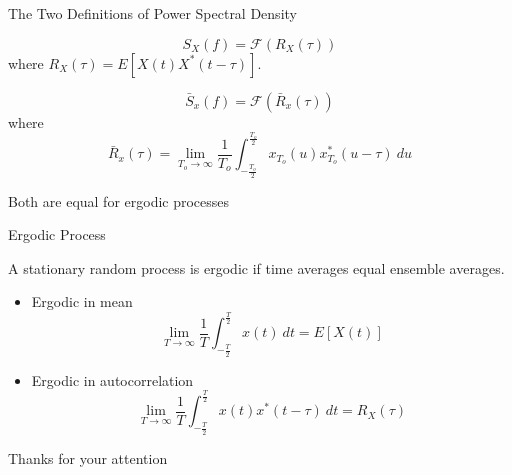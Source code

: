 \documentclass[t]{beamer}
\begin{document}
\begin{frame}{The Two Definitions of Power Spectral Density}
  \footnotesize
  \begin{definition}
    \pause
    \begin{equation*}
      S_X(f) = \mathcal{F}\left(R_X(\tau)\right)
    \end{equation*}
    where $R_X(\tau) = E\left[ X(t)X^*(t-\tau)\right]$.
  \end{definition}
  \pause
  \begin{definition}
    \begin{equation*}
    \bar{S}_x(f) = \mathcal{F}\left(\bar{R}_x(\tau)\right)
    \end{equation*}
    where
    \begin{equation*}
      \bar{R}_x(\tau) = \lim_{T_o \rightarrow \infty} \frac{1}{T_o} \int_{-\frac{T_o}{2}}^{\frac{T_o}{2}} x_{T_o}(u)x_{T_o}^*(u-\tau) \ du 
    \end{equation*}
  \end{definition}
  \pause
  \begin{center}
    Both are equal for ergodic processes
  \end{center}
  \normalsize
\end{frame}

\begin{frame}{Ergodic Process}
  \footnotesize
  \pause
  \begin{definition}[]
    A stationary random process is ergodic if time averages equal ensemble averages.
  \end{definition}
  \pause
  \begin{itemize}
    \item Ergodic in mean
      \begin{equation*}
        \lim_{T\rightarrow\infty} \frac{1}{T} \int_{-\frac{T}{2}}^{\frac{T}{2}} x(t) \ dt = E[X(t)]
      \end{equation*}
    \pause
    \item Ergodic in autocorrelation
      \begin{equation*}
        \lim_{T\rightarrow\infty} \frac{1}{T} \int_{-\frac{T}{2}}^{\frac{T}{2}} x(t)x^*(t-\tau) \ dt = R_X(\tau)
      \end{equation*}
  \end{itemize}
  \normalsize
\end{frame}

\begin{frame}{}
\vfill
\begin{center}
Thanks for your attention
\end{center}
\vfill
\end{frame}
\end{document}
